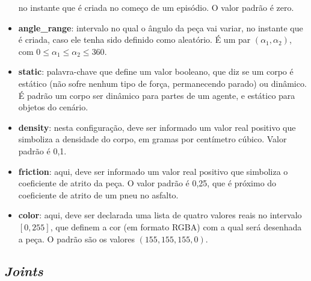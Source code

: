 \documentclass[cic,tc]{iiufrgs}
\begin{document}
\begin{itemize}
   no instante que é criada no começo de um episódio. O valor padrão é zero.
   \item \textbf{angle\_range}: intervalo no qual o ângulo da peça vai variar, no instante que é criada, caso ele tenha sido definido como aleatório. É um par $(\alpha_1, \alpha_2)$, com
   $0 \leq \alpha_1 \leq \alpha_2 \leq 360$.
   \item \textbf{static}: palavra-chave que define um valor booleano, que diz se um corpo é estático (não sofre nenhum tipo de força, permanecendo parado) ou dinâmico. É padrão um corpo ser dinâmico para partes de um
   agente, e estático para objetos do cenário.
   \item \textbf{density}: nesta configuração, deve ser informado um valor real positivo que simboliza a densidade do corpo, em gramas por centímetro cúbico. Valor padrão é 0,1.
   \item \textbf{friction}: aqui, deve ser informado um valor real positivo que simboliza o coeficiente de atrito da peça. O valor padrão é 0,25, que é próximo do coeficiente de atrito de um pneu no asfalto.
   \item \textbf{color}: aqui, deve ser declarada uma lista de quatro valores reais no intervalo $[0,255]$, que definem a cor (em formato RGBA) com a qual será desenhada a peça. O padrão são os valores $(155, 155, 155, 0)$.
 \end{itemize}
\subsection{\textit{Joints}}
\label{joints}
\end{document}
